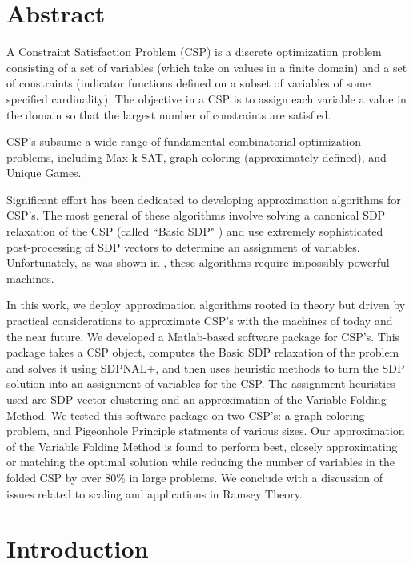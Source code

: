 \documentclass[12pt]{article} %
\begin{document}
\section*{Abstract}

A Constraint Satisfaction Problem (CSP) is a discrete optimization problem consisting of a set of variables (which take on values in a finite domain) and a set of constraints (indicator functions defined on a subset of variables of some specified cardinality). The objective in a CSP is to assign each variable a value in the domain so that the largest number of constraints are satisfied.

CSP's subsume a wide range of fundamental combinatorial optimization problems, including Max k-SAT, graph coloring (approximately defined), and Unique Games.

Significant effort has been dedicated to developing approximation algorithms for CSP's. The most general of these algorithms involve solving a canonical SDP relaxation of the CSP (called ``Basic SDP" \cite{raghavendra2008optimal}) and use extremely sophisticated post-processing of SDP vectors to determine an assignment of variables. Unfortunately, as was shown in \cite{dwivedi2015introduction}, these algorithms require impossibly powerful machines.

In this work, we deploy approximation algorithms rooted in theory but driven by practical considerations to approximate CSP's with the machines of today and the near future. We developed a Matlab-based software package for CSP's. This package takes a CSP object, computes the Basic SDP relaxation of the problem and solves it using SDPNAL+, and then uses heuristic methods to turn the SDP solution into an assignment of variables for the CSP.  The assignment heuristics used are SDP vector clustering and an approximation of the Variable Folding Method. We tested this software package on two CSP's: a graph-coloring problem, and Pigeonhole Principle statments of various sizes. Our approximation of the Variable Folding Method is found to perform best, closely approximating or matching the optimal solution while reducing the number of variables in the folded CSP by over 80\% in large problems. We conclude with a discussion of issues related to scaling and applications in Ramsey Theory.

\section{Introduction}
\end{document}
